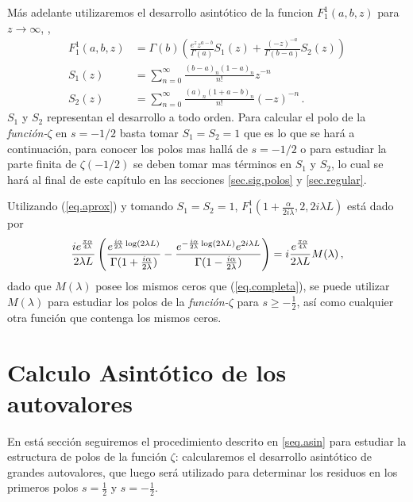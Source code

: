 Más adelante utilizaremos el desarrollo asintótico de la funcion $F _1 ^1 (a,b,z)$ para $z \rightarrow \infty$, \cite{Abramowitz:hyper},
\begin{equation}
\begin{aligned}
    F _1 ^1 (a,b,z) &= \Gamma (b) 
    \left(
    \frac{e^z z ^{a-b} }{\Gamma(a)}  S_1 (z) + \frac{(-z) ^{ -a}}{ \Gamma(b-a)} 
    S_2 (z)
    \right) \\[5pt]
    S _1 (z) &= \sum _{n=0} ^{\infty} \frac{(b-a) _n (1-a) _n}{n!} z ^{-n} \\[5pt]
    S _2 (z) &= \sum _{n=0} ^{\infty} \frac{(a) _n (1+a-b) _n}{n!} (-z) ^{-n}     
		\, .
\end{aligned}
\label{eq.aprox}
\end{equation}
$S_1$ y $S _2$ representan el desarrollo a todo orden. Para calcular el polo de la {\it función-$\zeta$} en $s=-1/2$ basta tomar $S _1 = S _2 = 1$ que es lo que se hará a continuación, para conocer los polos mas hallá de $s=-1/2$ o para estudiar la parte finita de $\zeta (-1/2)$ se deben tomar mas términos en $S_1$ y $S _2$, lo cual se hará al final de este capítulo en las secciones \ref{sec.sig.polos} y \ref{sec.regular}.


Utilizando (\ref{eq.aprox}) y tomando $S _1 = S _2 = 1$, $F _1 ^1 \left(1+  \frac{  \alpha}{2 i \lambda} ,2 ,2 i \lambda L  \right)$ está dado por
\begin{equation}
    \frac{i e ^{ \frac{\pi \alpha }{4 \lambda}  } }{2 \lambda L}
    \left(
    \frac{e ^{   \frac{ i \alpha}{2 \lambda}  \log (2 \lambda L) }}               {\Gamma(1+\frac{i \alpha}{2 \lambda})} -
    \frac{e ^{-  \frac{i \alpha}{2 \lambda}  \log (2 \lambda L) } e ^{2 i \lambda L} }{\Gamma(1-\frac{i \alpha}{2 \lambda})} 
    \right) \\[5pt]  
    =  i  \frac{e ^{ \frac{\pi \alpha }{4 \lambda}  } }{2 \lambda L}     M (\lambda) 
    \, ,
\label{eq.completa}
\end{equation}
dado que $M( \lambda)$ posee los mismos ceros que (\ref{eq.completa}), se puede utilizar $M( \lambda)$  para estudiar los polos de la {\it función-$\zeta$} para $s \geq - \frac{1}{2}$, así  como cualquier otra función que contenga los mismos ceros.

\section{Calculo Asintótico de los autovalores}\label{seq.2.asin}

En está sección seguiremos el procedimiento descrito en \ref{seq.asin} para estudiar la estructura de polos de la función $\zeta$: calcularemos el desarrollo asintótico de grandes autovalores, que luego será utilizado para determinar los residuos en los primeros polos $s= \frac{1}{2}$ y $s= - \frac{1}{2}$.



